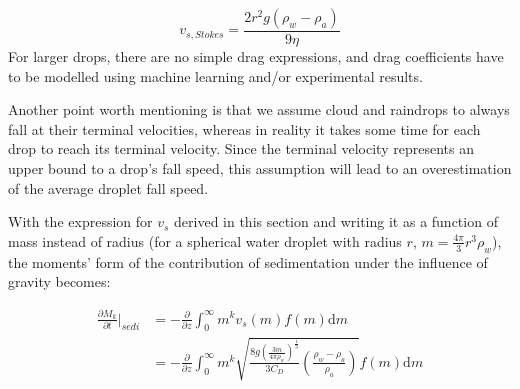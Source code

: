 \documentclass{report}
\begin{document}
\begin{equation}
    v_{s, Stokes} = \frac{2 r^2 g (\rho_w - \rho_a)}{9 \eta}
\label{eq:settling_velocity_stokes}
\end{equation}
For larger drops, there are no simple drag expressions, and drag coefficients have to be modelled using machine learning and/or experimental results.

Another point worth mentioning is that we assume cloud and raindrops to always fall at their terminal velocities, whereas in reality it takes some time for each drop to reach its terminal velocity. Since the terminal velocity represents an upper bound to a drop's fall speed, this assumption will lead to an overestimation of the average droplet fall speed.

With the expression for $v_s$ derived in this section and writing it as a function of mass instead of radius (for a spherical water droplet with radius $r$, $m = \frac{4 \pi}{3} r^3 \rho_w$), the moments' form of the contribution of sedimentation under the influence of gravity becomes:

\begin{equation}
\begin{aligned}
    \frac{\partial M_k}{\partial t} \biggr\rvert_{sedi} &= -\frac{\partial}{\partial z}\int_0^\infty m^k v_s(m) f(m) \text{d}m \\
                                                        &= -\frac{\partial}{\partial z}\int_0^\infty m^k \sqrt{\frac{8 g \left(\frac{3 m}{4 \pi \rho_w}\right)^{\frac{1}{3}}}{3 C_{D}} \left( \frac{\rho_{w} - \rho_a}{\rho_a} \right)} f(m) \text{d}m
\end{aligned}
\label{eq:sedimentation_moments}

\end{equation}
\end{document}
